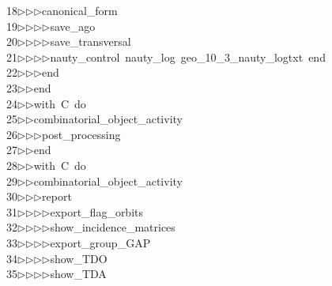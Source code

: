 \begin{tabbing}
18\>$\triangleright$\>$\triangleright$\>$\triangleright$\>canonical\_form\ \\[0pt]
19\>$\triangleright$\>$\triangleright$\>$\triangleright$\>$\triangleright$\>save\_ago\ \\[0pt]
20\>$\triangleright$\>$\triangleright$\>$\triangleright$\>$\triangleright$\>save\_transversal\ \\[0pt]
21\>$\triangleright$\>$\triangleright$\>$\triangleright$\>$\triangleright$\>nauty\_control\ nauty\_log\ geo\_10\_3\_nauty\_logtxt\ end\ \\[0pt]
22\>$\triangleright$\>$\triangleright$\>$\triangleright$\>end\ \\[0pt]
23\>$\triangleright$\>$\triangleright$\>end\ \\[0pt]
24\>$\triangleright$\>$\triangleright$\>with\ C\ do\ \\[0pt]
25\>$\triangleright$\>$\triangleright$\>combinatorial\_object\_activity\ \\[0pt]
26\>$\triangleright$\>$\triangleright$\>$\triangleright$\>post\_processing\ \\[0pt]
27\>$\triangleright$\>$\triangleright$\>end\ \\[0pt]
28\>$\triangleright$\>$\triangleright$\>with\ C\ do\ \\[0pt]
29\>$\triangleright$\>$\triangleright$\>combinatorial\_object\_activity\ \\[0pt]
30\>$\triangleright$\>$\triangleright$\>$\triangleright$\>report\ \\[0pt]
31\>$\triangleright$\>$\triangleright$\>$\triangleright$\>$\triangleright$\>export\_flag\_orbits\ \\[0pt]
32\>$\triangleright$\>$\triangleright$\>$\triangleright$\>$\triangleright$\>show\_incidence\_matrices\ \\[0pt]
33\>$\triangleright$\>$\triangleright$\>$\triangleright$\>$\triangleright$\>export\_group\_GAP\ \\[0pt]
34\>$\triangleright$\>$\triangleright$\>$\triangleright$\>$\triangleright$\>show\_TDO\ \\[0pt]
35\>$\triangleright$\>$\triangleright$\>$\triangleright$\>$\triangleright$\>show\_TDA\ \\[0pt]

\end{tabbing}
